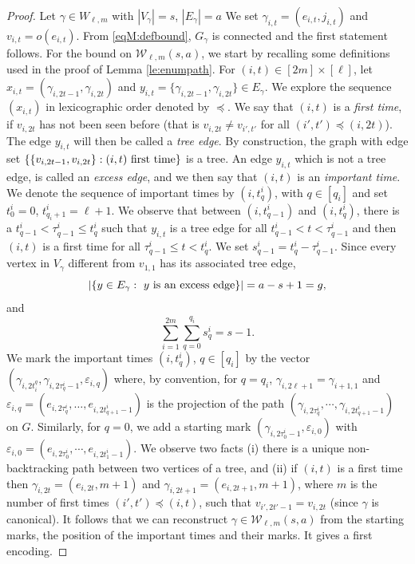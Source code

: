 \documentclass[11pt]{article}
\newcommand{\cE}{E}
\newcommand{\cW}{\mathcal {W}}
\newcommand{\ABS}[1]{{{\left| #1 \right|}}} %
\newcommand{\BRA}[1]{{{\left\{#1\right\}}}}
\newcommand{\1}{1\!\!{\sf I}}\newcommand{\IND}{\1}
\newcommand{\veps}{\varepsilon}
\begin{document}
\begin{proof}
Let $\gamma \in W_{\ell,m}$ with $|V_\gamma| = s$, $|E_\gamma| = a$ We set $\gamma_{i,t} = (e_{i,t}, j_{i,t})$ and $v_{i,t} = o(e_{i,t})$. From \eqref{eqM:defbound}, $G_\gamma$ is connected and the first statement follows. For the bound on $\cW _{\ell,m} (s,a) $, we start by recalling some definitions used in the proof of Lemma \ref{le:enumpath}. For $ (i,t) \in [2m] \times [\ell]$, let $x_{i,t} = ( \gamma_{i,2t-1}, \gamma_{i,2t} )$ and $y_{i,t} =  \{ \gamma_{i,2t-1}, \gamma_{i,2t} \} \in \cE_\gamma$. We explore the sequence $(x_{i,t})$ in lexicographic order denoted by $\preceq$. We say that $(i ,t)$ is a {\em first time}, if $v_{i,2t}$ has not been seen before (that is $v_{i,2t} \ne v_{i', t'}$ for all $(i',t') \preceq (i,2t)$). The edge $y_{i,t}$ will then be called a {\em tree edge}. By construction, the graph with edge set $\{\{v_{i,2t-1}, v_{i,2t} \} : (i,t) \hbox{ first time}\}$ is a tree. An edge  $y_{i,t}$ which is not a tree edge, is called an {\em excess edge}, and we then say that $(i,t)$ is an {\em important time}. We denote the sequence of important times by $(i,t^i_{q})$, with $ q \in[ q_i]$ and set $t^i_{0} = 0$, $t^i_{q_i+1} = \ell+1$. We observe that between $(i,t^i_{q-1})$ and $(i,t^i_q)$, there is a $t^i_{q-1} < \tau^i_{q-1} \leq t^i_{q}$ such that  $y_{i,t}$ is a tree edge for all $t^i_{q-1}<  t < \tau^i_{q-1}$ and then $(i,t)$ is a first time for all $\tau^i_{q-1} \leq t <  t^i_{q}$. We set $s^i_{q-1} = t^i_q - \tau^i_{q-1}$.   Since every vertex in $V_\gamma$ different from $v_{1,1}$ has its associated tree edge,
\begin{equation*}\label{eqM:defchi}
 \ABS{ \BRA{ y \in \cE_\gamma : \hbox{ $y$ is an excess edge}} } = a - s +1 = g,
\end{equation*}
and
\begin{equation}\label{eqM:sumsiq}
\sum_{i = 1}^{2m}\sum_{q=0}^{q_i} s^i_{q} = s-1.
\end{equation}
We mark the important times $(i,t^i_q)$, $q \in [q_i]$  by the vector $(\gamma_{i,2t^q_i},\gamma_{i,2\tau^i_q-1},\veps_{i,q})$ where, by convention, for $q = q_i$, $\gamma_{i,2\ell+1} = \gamma_{i+1, 1}$ and $\veps_{i,q} = (e_{i,2\tau^i_q},  \ldots, e_{i,2 t^i_{q+1} -1})$ is the projection of the  path $(\gamma_{i,2\tau^i_q}, \cdots, \gamma_{i,2 t^i_{q+1} -1})$  on $G$. Similarly, for $q=0$, we add a starting mark $(\gamma_{i,2\tau^i_0-1},\veps_{i,0})$ with $\veps_{i,0} = (e_{i,2\tau^i_0 },  \cdots, e_{i,2 t^i_{1} -1})$.  We observe two facts (i) there is a unique non-backtracking path between two vertices of a tree, and (ii) if $(i,t)$ is a first time then  $\gamma_{i,2t} = ( e_{i,2t} , m+1)$ and $\gamma_{i,2t+1} = (e_{i,2t+1} , m+1)$, where $m$ is the number of  first times $(i',t') \preceq (i,t)$, such that $v_{i',2t'-1} = v_{i,2t}$ (since $\gamma$ is canonical). It follows that we can reconstruct $\gamma \in \cW_{\ell,m}(s,a)$ from the starting marks, the position of the important times and their marks. It gives a first encoding. 



\end{proof}
\end{document}
